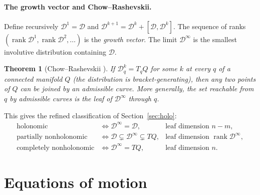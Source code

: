 \documentclass[11pt,a4paper]{article}
\theoremstyle{definition}
\theoremstyle{plain}
\newtheorem{theorem}{Theorem}[section]
\theoremstyle{remark}
\DeclareMathOperator{\rank}{rank}
\begin{document}
\paragraph{The growth vector and Chow--Rashevskii.}
Define recursively $\mathcal D^1=\mathcal D$ and $\mathcal D^{k+1}=\mathcal D^k+[\mathcal D,\mathcal D^k]$.
The sequence of ranks $(\rank\mathcal D^1,\rank\mathcal D^2,\dots)$ is the \emph{growth vector}. The
limit $\mathcal D^\infty$ is the smallest involutive distribution containing $\mathcal D$.

\begin{theorem}[Chow--Rashevskii \cite{Chow1939}]\label{thm:chow}
If $\mathcal D^k_q=T_qQ$ for some $k$ at every $q$ of a connected manifold $Q$ (the
distribution is \emph{bracket-generating}), then any two points of $Q$ can be joined by an
admissible curve. More generally, the set reachable from $q$ by admissible curves is the
leaf of $\mathcal D^\infty$ through $q$.
\end{theorem}

This gives the refined classification of Section~\ref{sec:holo}:
\[
\begin{array}{lll}
\text{holonomic} & \iff \mathcal D^\infty=\mathcal D, & \text{leaf dimension } n-m,\\
\text{partially nonholonomic} & \iff \mathcal D\subsetneq\mathcal D^\infty\subsetneq TQ, & \text{leaf dimension } \rank\mathcal D^\infty,\\
\text{completely nonholonomic} & \iff \mathcal D^\infty=TQ, & \text{leaf dimension } n.
\end{array}
\]

\section{Equations of motion}\label{sec:dynamics}
\end{document}
